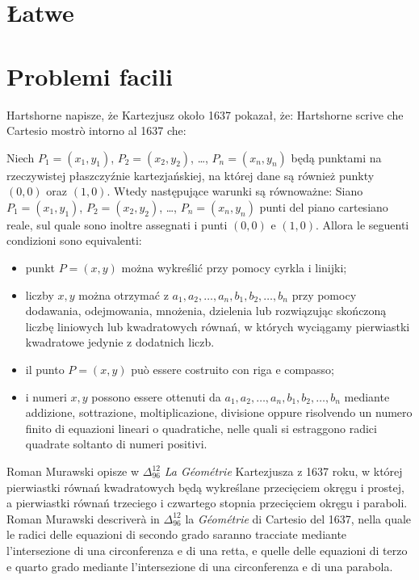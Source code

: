 
%

\section{Łatwe} %
\section{Problemi facili} %

Hartshorne \cite[s. 122]{hartshorne_2000} napisze, że Kartezjusz około 1637 pokazał, że: %
Hartshorne \cite[p. 122]{hartshorne_2000} scrive che Cartesio mostrò intorno al 1637 che: %

\begin{proposition}
    Niech $P_1 = (x_1, y_1)$, $P_2 = (x_2, y_2)$, \ldots, $P_n = (x_n, y_n)$ będą punktami na rzeczywistej płaszczyźnie kartezjańskiej, na której dane są również punkty $(0, 0)$ oraz $(1, 0)$. %
    Wtedy następujące warunki są równoważne: %
    Siano $P_1 = (x_1, y_1)$, $P_2 = (x_2, y_2)$, \ldots, $P_n = (x_n, y_n)$ punti del piano cartesiano reale, sul quale sono inoltre assegnati i punti $(0,0)$ e $(1,0)$. %
    Allora le seguenti condizioni sono equivalenti: %
    \begin{itemize}
        \item punkt $P = (x, y)$ można wykreślić przy pomocy cyrkla i linijki; %
        \item liczby $x, y$ można otrzymać z $a_1, a_2, \ldots, a_n, b_1, b_2, \ldots, b_n$ przy pomocy dodawania, odejmowania, mnożenia, dzielenia lub rozwiązując skończoną liczbę liniowych lub kwadratowych równań, w których wyciągamy pierwiastki kwadratowe jedynie z dodatnich liczb. %
        \item il punto $P=(x,y)$ può essere costruito con riga e compasso; %
        \item i numeri $x,y$ possono essere ottenuti da $a_1, a_2, \ldots, a_n, b_1, b_2, \ldots, b_n$ mediante addizione, sottrazione, moltiplicazione, divisione oppure risolvendo un numero finito di equazioni lineari o quadratiche, nelle quali si estraggono radici quadrate soltanto di numeri positivi. %
    \end{itemize}
\end{proposition}

Roman Murawski opisze w $\Delta_{96}^{12}$ \emph{La Géométrie} Kartezjusza z 1637 roku, w której pierwiastki równań kwadratowych będą wykreślane przecięciem okręgu i prostej, a pierwiastki równań trzeciego i czwartego stopnia przecięciem okręgu i paraboli. %
Roman Murawski descriverà in $\Delta_{96}^{12}$ la \emph{Géométrie} di Cartesio del 1637, nella quale le radici delle equazioni di secondo grado saranno tracciate mediante l'intersezione di una circonferenza e di una retta, e quelle delle equazioni di terzo e quarto grado mediante l'intersezione di una circonferenza e di una parabola. %

